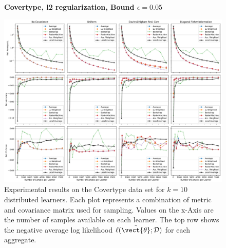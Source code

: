     \begin{landscape}
    \begin{figure}
        \centering
        \textbf{Covertype, l2 regularization, Bound $\epsilon=0.05$}\par\medskip
        \includegraphics[height=\dimexpr \textheight - 1\baselineskip\relax]{kapitel/figures/covertype_l2_0.05_neg_relative.pdf}
        \caption[Covertype plots with l2 regularization and $\epsilon=0.05$]{Experimental results on the Covertype data set for $k=10$ distributed learners. Each plot represents a combination of metric and covariance matrix used for sampling. Values on the x-Axis are the number of samples available on each learner. The top row shows the negative average log likelihood $\ell(\tilde{\vect{\theta}}; \mathcal{D})$ for each aggregate.}
        \label{fig:analysis2}
    \end{figure}
    \end{landscape}
